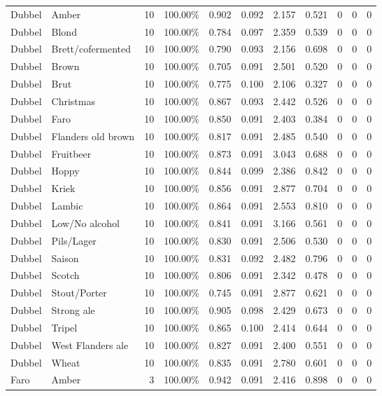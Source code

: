 {\begin{longtable}{llrrrrrrrrr}
Dubbel & Amber & 10 & 100.00\% & 0.902 & 0.092 & 2.157 & 0.521 & 0 & 0 & 0 \\
Dubbel & Blond & 10 & 100.00\% & 0.784 & 0.097 & 2.359 & 0.539 & 0 & 0 & 0 \\
Dubbel & Brett/cofermented & 10 & 100.00\% & 0.790 & 0.093 & 2.156 & 0.698 & 0 & 0 & 0 \\
Dubbel & Brown & 10 & 100.00\% & 0.705 & 0.091 & 2.501 & 0.520 & 0 & 0 & 0 \\
Dubbel & Brut & 10 & 100.00\% & 0.775 & 0.100 & 2.106 & 0.327 & 0 & 0 & 0 \\
Dubbel & Christmas & 10 & 100.00\% & 0.867 & 0.093 & 2.442 & 0.526 & 0 & 0 & 0 \\
Dubbel & Faro & 10 & 100.00\% & 0.850 & 0.091 & 2.403 & 0.384 & 0 & 0 & 0 \\
Dubbel & Flanders old brown & 10 & 100.00\% & 0.817 & 0.091 & 2.485 & 0.540 & 0 & 0 & 0 \\
Dubbel & Fruitbeer & 10 & 100.00\% & 0.873 & 0.091 & 3.043 & 0.688 & 0 & 0 & 0 \\
Dubbel & Hoppy & 10 & 100.00\% & 0.844 & 0.099 & 2.386 & 0.842 & 0 & 0 & 0 \\
Dubbel & Kriek & 10 & 100.00\% & 0.856 & 0.091 & 2.877 & 0.704 & 0 & 0 & 0 \\
Dubbel & Lambic & 10 & 100.00\% & 0.864 & 0.091 & 2.553 & 0.810 & 0 & 0 & 0 \\
Dubbel & Low/No alcohol & 10 & 100.00\% & 0.841 & 0.091 & 3.166 & 0.561 & 0 & 0 & 0 \\
Dubbel & Pils/Lager & 10 & 100.00\% & 0.830 & 0.091 & 2.506 & 0.530 & 0 & 0 & 0 \\
Dubbel & Saison & 10 & 100.00\% & 0.831 & 0.092 & 2.482 & 0.796 & 0 & 0 & 0 \\
Dubbel & Scotch & 10 & 100.00\% & 0.806 & 0.091 & 2.342 & 0.478 & 0 & 0 & 0 \\
Dubbel & Stout/Porter & 10 & 100.00\% & 0.745 & 0.091 & 2.877 & 0.621 & 0 & 0 & 0 \\
Dubbel & Strong ale & 10 & 100.00\% & 0.905 & 0.098 & 2.429 & 0.673 & 0 & 0 & 0 \\
Dubbel & Tripel & 10 & 100.00\% & 0.865 & 0.100 & 2.414 & 0.644 & 0 & 0 & 0 \\
Dubbel & West Flanders ale & 10 & 100.00\% & 0.827 & 0.091 & 2.400 & 0.551 & 0 & 0 & 0 \\
Dubbel & Wheat & 10 & 100.00\% & 0.835 & 0.091 & 2.780 & 0.601 & 0 & 0 & 0 \\
Faro & Amber & 3 & 100.00\% & 0.942 & 0.091 & 2.416 & 0.898 & 0 & 0 & 0 \\

\end{longtable}}
